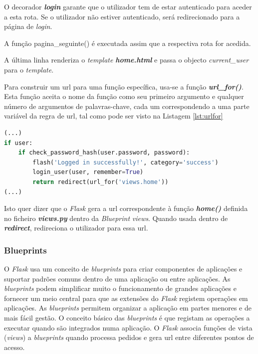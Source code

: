 O decorador \textit{\textbf{login}} garante que o utilizador tem de estar autenticado para aceder a esta rota. Se o utilizador não estiver autenticado, será redirecionado para a página de \textit{login}.

A função pagina\_seguinte() é executada assim que a respectiva rota for acedida.

A última linha renderiza o \textit{template} \textit{\textbf{home.html}} e passa o objecto \textit{current\_user} para o \textit{template}.

Para construir um \acrshort{url} para uma função específica, usa-se a função \textit{\textbf{url\_for()}}. Esta função aceita o nome da função como seu primeiro argumento e qualquer número de argumentos de palavras-chave, cada um correspondendo a uma parte variável da regra de \acrshort{url}, tal como pode ser visto na Listagem \ref{lst:urlfor}

\begin{minipage}{0.9\linewidth}
	\begin{lstlisting}[language=Python, caption=Contrução de \textit{url}s - \textit{auth.py}, label=lst:urlfor]
(...)
if user:
    if check_password_hash(user.password, password):
        flash('Logged in successfully!', category='success')
        login_user(user, remember=True)
        return redirect(url_for('views.home'))
(...)
\end{lstlisting}
\end{minipage}

Isto quer dizer que o \textit{Flask} gera a \acrshort{url} correspondente à função \textit{\textbf{home()}} definida no ficheiro \textit{\textbf{views.py}} dentro da \textit{Blueprint} \textit{views}. Quando usada dentro de \textit{\textbf{redirect}}, redireciona o utilizador para essa \acrshort{url}.

\subsubsection{Blueprints}
O \textit{Flask} usa um conceito de \textit{blueprints} para criar componentes de aplicações e suportar padrões comuns dentro de uma aplicação ou entre aplicações. As \textit{blueprints} podem simplificar muito o funcionamento de grandes aplicações e fornecer um meio central para que as extensões do \textit{Flask} registem operações em aplicações. As \textit{blueprints} permitem organizar a aplicação em partes menores e de mais fácil gestão. O conceito básico das \textit{blueprints} é que registam as operações a executar quando são integrados numa aplicação. O \textit{Flask} associa funções de vista (\textit{views}) a \textit{blueprints} quando processa pedidos e gera \acrshort{url} entre diferentes pontos de acesso.

